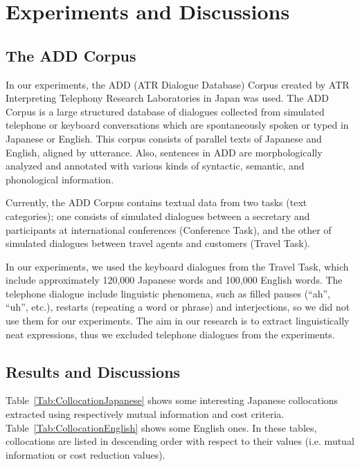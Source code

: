 \section{Experiments and Discussions}

\subsection{The ADD Corpus}

In our experiments, the ADD (ATR Dialogue Database) Corpus \cite{Ehara90}
created by ATR Interpreting Telephony Research Laboratories in Japan
was used.
The ADD Corpus is a large structured database of dialogues collected
from simulated telephone or keyboard conversations
which are spontaneously spoken or typed in Japanese or English.
This corpus consists of parallel texts of Japanese and English,
aligned by utterance.
Also, sentences in ADD are morphologically analyzed
and annotated with various kinds of syntactic, semantic, and phonological information.

Currently, the ADD Corpus contains textual data from two tasks (text categories);
one consists of simulated dialogues between a secretary and participants
at international conferences (Conference Task),
and the other of simulated dialogues between travel agents and customers (Travel Task).

In our experiments,
we used the keyboard dialogues from the Travel Task,
which include approximately 120,000 Japanese words
and 100,000 English words.
The telephone dialogue include linguistic phenomena,
such as filled pauses (``ah'', ``uh'', etc.),
restarts (repeating a word or phrase) and interjections,
so we did not use them for our experiments.
The aim in our research is to extract linguistically
neat expressions,
thus we excluded telephone dialogues from the experiments.


\subsection{Results and Discussions}

Table~\ref{Tab:CollocationJapanese}
shows some interesting Japanese collocations extracted
using respectively mutual information and cost criteria.
Table~\ref{Tab:CollocationEnglish} shows some English ones.
In these tables, collocations are listed in descending order
with respect to their values
(i.e. mutual information or cost reduction values).


